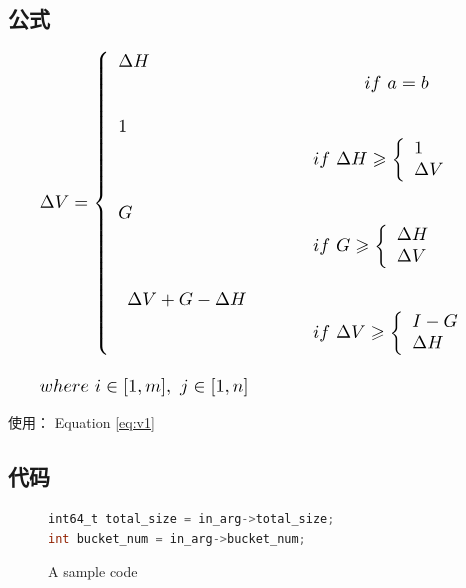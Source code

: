\documentclass[twocolumn, twoside]{article}
\begin{document}
\subsection{公式}
\begin{equation}\label{eq:v1}
\resizebox{.95\linewidth}{!} {$
\begin{array}{l}
\Delta V = \left\{\begin{array}{l}  \Delta H \\
\phantom{\hspace{4.8cm}} if \  a = b  \\  \\
 1 \\ 
\phantom{\hspace{3.8cm}} if \ \Delta H \geqslant \left\{\begin{array}{l}
1 \\ \Delta V
\end{array}\right. \\ \\
G  \\
\phantom{\hspace{3.8cm}} if \ G \geqslant \left\{\begin{array}{l}
\Delta H \\ \Delta V
\end{array}\right. \\ \\
\begin{array}{l}
\Delta V +  G  - \Delta H 
\end{array} \\
\phantom{\hspace{3.8cm}} if \ \Delta V \geqslant \left\{\begin{array}{l}
I-G\\ \Delta H
\end{array}\right.
\end{array}\right.
\\ \\
where \ i \in [1,m], \ j \in [1,n]
\end{array}
$}
\end{equation}

使用： Equation \eqref{eq:v1} 

\blindtext
\subsection{代码}

\begin{figure}[!htb]
\centering
\begin{lstlisting}[language={C}]
int64_t total_size = in_arg->total_size;
int bucket_num = in_arg->bucket_num;

\end{lstlisting}
\caption{A sample code}\label{fig:code}
\end{figure}
\end{document}
